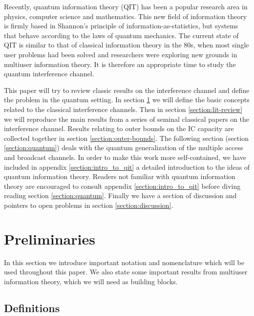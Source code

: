 \documentclass[aps,11pt,twoside,letterpaper]{article}
\begin{document}
    Recently, quantum information theory (QIT) has been a popular research area in physics,
    computer science and mathematics. This new field of information theory is firmly based
    in Shannon's principle of information-as-statistics, but systems that behave 
    according to the laws of quantum mechanics.
    The current state of QIT is similar to that of classical information theory in the 80s,
    when most single user problems had been solved and researchers were exploring new
    grounds in multiuser information theory.
    It is therefore an appropriate time to study the quantum interference channel.

    
    This paper will try to review classic results on the interference channel and
    define the problem in the quantum setting.
    In section \ref{Preliminaries} we will define the basic concepts related to
    the classical interference channels.
    Then in section \ref{section:lit-review} we will reproduce the main results
    from a series of seminal classical papers on the interference channel.
    Results relating to outer bounds on the IC capacity are collected together
    in section  \ref{section:outer-bounds}.
    The following section (section \ref{section:quantum}) deals with the quantum generalization of the
    multiple access and broadcast channels. 
    	In order to make this work more self-contained, we have included
	in appendix \ref{section:intro_to_qit} a detailed introduction to 
	the ideas of quantum information theory.  Readers not familiar with quantum information theory are encouraged 
    to consult appendix \ref{section:intro_to_qit} before diving reading section \ref{section:quantum}.
    Finally we have a section of discussion and pointers to open problems in section  \ref{section:discussion}.

    
    
    
 \section{Preliminaries}  \label{Preliminaries} 

    In this section we introduce important notation and nomenclature which will
    be used throughout this paper.
    We also state some important results from multiuser information theory,
    which we will need as building blocks.

    \subsection{Definitions}
	
\end{document}
